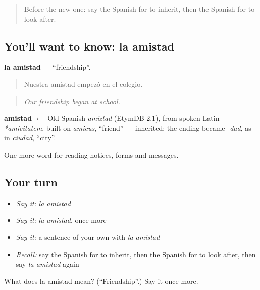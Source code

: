 \label{lesson:ES-C497-amistad}



\begin{quote}
Before the new one: say the Spanish for to inherit, then the Spanish for to look after.
\end{quote}

\subsection*{You'll want to know: la amistad}
\textbf{la amistad} — \textquotedblleft{}friendship\textquotedblright{}.

\begin{quote}
Nuestra amistad empezó en el colegio.
\end{quote}

\begin{quote}
\emph{Our friendship began at school.}
\end{quote}

\begin{cousinweb}
\textbf{amistad} $\leftarrow$ Old Spanish \emph{amiztad} (EtymDB 2.1), from spoken Latin \emph{*amicitatem}, built on \emph{amicus}, \textquotedblleft{}friend\textquotedblright{} — inherited: the ending became \emph{-dad}, as in \emph{ciudad}, \textquotedblleft{}city\textquotedblright{}.
\end{cousinweb}

\begin{grammarlens}[title={What you've built}]
One more word for reading notices, forms and messages.
\end{grammarlens}

\subsection*{Your turn}
\begin{itemize}
\raggedright
  \item \emph{Say it:} \emph{la amistad}
  \item \emph{Say it:} \emph{la amistad}, once more
  \item \emph{Say it:} a sentence of your own with \emph{la amistad}
  \item \emph{Recall:} say the Spanish for to inherit, then the Spanish for to look after, then say \emph{la amistad} again
\end{itemize}

\begin{tcolorbox}[breakable,colback=teal!4,colframe=teal!35!black,title={Before you move on}]
What does la amistad mean? (\textquotedblleft{}Friendship\textquotedblright{}.) Say it once more.
\end{tcolorbox}
